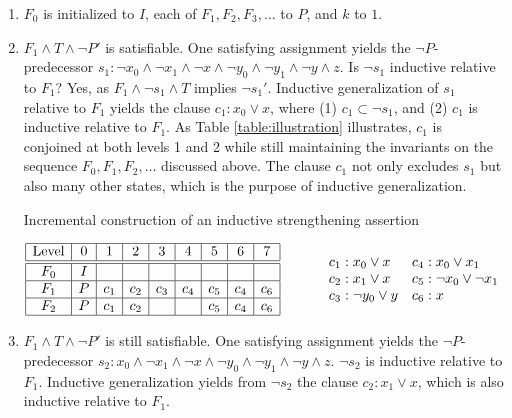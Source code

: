 \documentclass{llncs}
\newcommand{\band}{\wedge}
\newcommand{\bor}{\vee}
\newcommand{\bnot}{\neg}
\begin{document}
\begin{enumerate}
\item $F_{0}$ is initialized to $I$, each of $F_{1}, F_{2}, F_{3}, \ldots$ to $P$, and $k$ to $1$.

\item $F_{1} \band T \band \bnot P'$ is satisfiable.  One satisfying
  assignment yields the $\bnot P$-predecessor $s_1: \bnot x_0 \band
  \bnot x_1 \band \bnot x \band \bnot y_0 \band \bnot y_1 \band \bnot
  y \band z$.  Is $\bnot s_1$ inductive relative to $F_{1}$?  Yes, as
  $F_{1} \band \bnot s_1 \band T$ implies $\bnot s_1'$.  Inductive
  generalization of $s_1$ relative to $F_{1}$ yields the clause $c_1:
  x_0 \bor x$, where (1) $c_1 \subset \bnot s_1$, and (2) $c_1$ is
  inductive relative to $F_{1}$.  As Table \ref{table:illustration}
  illustrates, $c_1$ is conjoined at both levels 1 and 2 while still
  maintaining the invariants on the sequence $F_0,F_1,F_2,\ldots$
  discussed above.  The clause $c_1$ not only excludes $s_1$ but also
  many other states, which is the purpose of inductive generalization.

\begin{table}[tb]
\caption{Incremental construction of an inductive strengthening assertion}
\label{table:illustration}
\centering
\vspace{-1ex}
$\begin{array}{|c|c|c|c|c|c|c|c|c|}
\hline
\mbox{Level} & 0 & 1 & 2 & 3 & 4 & 5 & 6 & 7 \\ \hline\hline
F_{0} & I &     &     &     &     &     &     &     \\ \hline
F_{1} & P & c_1 & c_2 & c_3 & c_4 & c_5 & c_4 & c_6 \\ \hline
F_{2} & P & c_1 & c_2 &     &     & c_5 & c_4 & c_6 \\ \hline
\end{array}\quad\quad\quad
\begin{array}{l@{\quad}l}
c_1: x_0 \bor x &       c_4: x_0 \bor x_1 \\
c_2: x_1 \bor x &       c_5: \bnot x_0 \bor \bnot x_1 \\
c_3: \bnot y_0 \bor y & c_6: x
\end{array}
$
\vspace{1em}
\end{table}

\item $F_{1} \band T \band \bnot P'$ is still satisfiable.  One
  satisfying assignment yields the $\bnot P$-predecessor $s_2: x_0
  \band \bnot x_1 \band \bnot x \band \bnot y_0 \band \bnot y_1 \band
  \bnot y \band z$.  $\bnot s_2$ is inductive relative to $F_{1}$.
  Inductive generalization yields from $\bnot s_2$ the clause $c_2:
  x_1 \bor x$, which is also inductive relative to $F_{1}$.


\end{enumerate}
\end{document}
